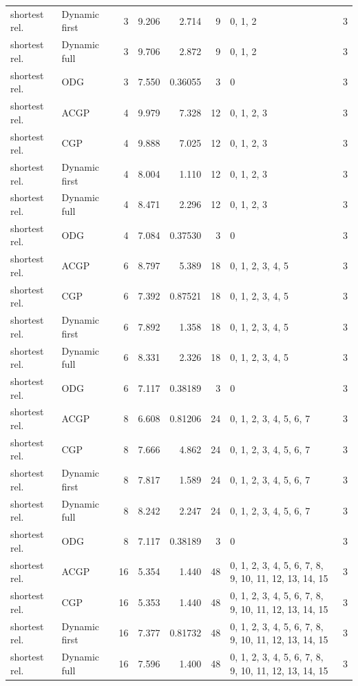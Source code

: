 \documentclass[10pt,a4paper]{article}
\begin{document}
\begin{longtable}{@{}p{23mm}p{29mm}rrrrp{36mm}r@{}}
shortest rel. & Dynamic first & 3 & 9.206 & 2.714 & 9 & 0, 1, 2 & 3 \\
shortest rel. & Dynamic full & 3 & 9.706 & 2.872 & 9 & 0, 1, 2 & 3 \\
shortest rel. & ODG & 3 & 7.550 & 0.36055 & 3 & 0 & 3 \\
shortest rel. & ACGP & 4 & 9.979 & 7.328 & 12 & 0, 1, 2, 3 & 3 \\
shortest rel. & CGP & 4 & 9.888 & 7.025 & 12 & 0, 1, 2, 3 & 3 \\
shortest rel. & Dynamic first & 4 & 8.004 & 1.110 & 12 & 0, 1, 2, 3 & 3 \\
shortest rel. & Dynamic full & 4 & 8.471 & 2.296 & 12 & 0, 1, 2, 3 & 3 \\
shortest rel. & ODG & 4 & 7.084 & 0.37530 & 3 & 0 & 3 \\
shortest rel. & ACGP & 6 & 8.797 & 5.389 & 18 & 0, 1, 2, 3, 4, 5 & 3 \\
shortest rel. & CGP & 6 & 7.392 & 0.87521 & 18 & 0, 1, 2, 3, 4, 5 & 3 \\
shortest rel. & Dynamic first & 6 & 7.892 & 1.358 & 18 & 0, 1, 2, 3, 4, 5 & 3 \\
shortest rel. & Dynamic full & 6 & 8.331 & 2.326 & 18 & 0, 1, 2, 3, 4, 5 & 3 \\
shortest rel. & ODG & 6 & 7.117 & 0.38189 & 3 & 0 & 3 \\
shortest rel. & ACGP & 8 & 6.608 & 0.81206 & 24 & 0, 1, 2, 3, 4, 5, 6, 7 & 3 \\
shortest rel. & CGP & 8 & 7.666 & 4.862 & 24 & 0, 1, 2, 3, 4, 5, 6, 7 & 3 \\
shortest rel. & Dynamic first & 8 & 7.817 & 1.589 & 24 & 0, 1, 2, 3, 4, 5, 6, 7 & 3 \\
shortest rel. & Dynamic full & 8 & 8.242 & 2.247 & 24 & 0, 1, 2, 3, 4, 5, 6, 7 & 3 \\
shortest rel. & ODG & 8 & 7.117 & 0.38189 & 3 & 0 & 3 \\
shortest rel. & ACGP & 16 & 5.354 & 1.440 & 48 & 0, 1, 2, 3, 4, 5, 6, 7, 8, 9, 10, 11, 12, 13, 14, 15 & 3 \\
shortest rel. & CGP & 16 & 5.353 & 1.440 & 48 & 0, 1, 2, 3, 4, 5, 6, 7, 8, 9, 10, 11, 12, 13, 14, 15 & 3 \\
shortest rel. & Dynamic first & 16 & 7.377 & 0.81732 & 48 & 0, 1, 2, 3, 4, 5, 6, 7, 8, 9, 10, 11, 12, 13, 14, 15 & 3 \\
shortest rel. & Dynamic full & 16 & 7.596 & 1.400 & 48 & 0, 1, 2, 3, 4, 5, 6, 7, 8, 9, 10, 11, 12, 13, 14, 15 & 3 \\

\end{longtable}
\end{document}

